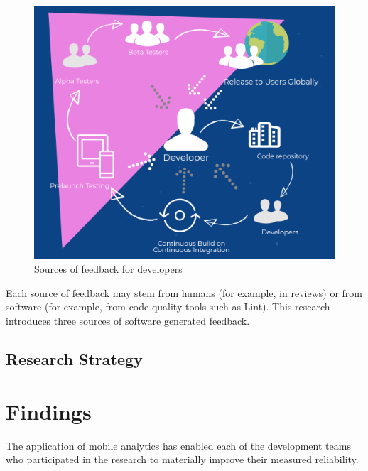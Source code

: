 \begin{figure}[htbp!]
    \centering
    \includegraphics[width=13cm]{images/silvias-developer-centric-figure-mobilesoft2020.png}
    \caption{Sources of feedback for developers}
    \label{fig:sources-of-feedback-for-developers}
\end{figure}

Each source of feedback may stem from humans (for example, in reviews) or from software (for example, from code quality tools such as Lint). This research introduces three sources of software generated feedback.

\subsection{Research Strategy}


\section{Findings}\label{findings-section}

The application of mobile analytics has enabled each of the development teams who participated in the research to materially improve their measured reliability. 

